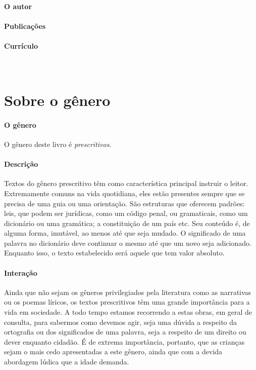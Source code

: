 \documentclass[11pt]{extarticle}
\begin{document}
\paragraph{O autor} 

\paragraph{Publicações} 

\paragraph{Currículo} 
 


\section{Sobre o gênero}

\paragraph{O gênero} O gênero deste livro é \textit{prescritivos}. 

\paragraph{Descrição} 
Textos do gênero prescritivo têm como característica principal instruir
o leitor. Extremamente comuns na vida quotidiana, eles estão presentes
sempre que se precisa de uma guia ou uma orientação. São estruturas 
que oferecem padrões: leis, que podem ser jurídicas, como um código
penal, ou gramaticais, como um dicionário ou uma gramática; a constituição
de um país etc. Seu conteúdo é, de alguma forma, imutável, ao menos até que seja
mudado. O significado de uma palavra no dicionário deve continuar o mesmo
até que um novo seja adicionado. Enquanto isso, o texto
estabelecido será aquele que tem valor absoluto.


\paragraph{Interação} 
Ainda que não sejam os gêneros privilegiados pela literatura
como as narrativas ou os poemas líricos, os textos prescritivos
têm uma grande importância para a vida em sociedade. A todo 
tempo estamos recorrendo a estas obras, em geral de consulta, para
sabermos como devemos agir, seja uma dúvida a respeito da ortografia ou 
dos significados de uma palavra, seja a respeito de um direito ou dever
enquanto cidadão. É de extrema importância, portanto, que as crianças
sejam o mais cedo apresentadas a este gênero, ainda que com a 
devida abordagem lúdica que a idade demanda. 
\end{document}
